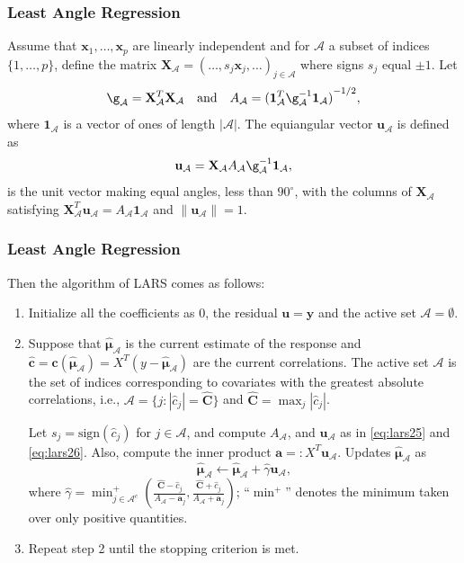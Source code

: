 \begin{frame}
\frametitle{Least Angle Regression}
Assume that $\mathbf{x}_1,\dots,\mathbf{x}_p$ are linearly independent and for $\mathcal{A}$ a subset of indices $\{1,\dots,p\}$, define the matrix $\mathbf{X}_\mathcal{A}={(\dots,s_j\mathbf{x}_j,\dots)}_{j\in\mathcal{A}}$ where signs $s_j$ equal $\pm 1$. Let
\begin{equation}
    \g_\mathcal{A}=\mathbf{X}_\mathcal{A}^T\mathbf{X}_\mathcal{A}
    \quad \text{and} \quad
    A_\mathcal{A}={(\mathbf{1}^T_\mathcal{A}\g^{-1}_\mathcal{A}\mathbf{1}_\mathcal{A})}^{-1/2},\label{eq:lars25}
\end{equation}
where $\mathbf{1}_\mathcal{A}$ is a vector of ones of length $|\mathcal{A}|$. The equiangular vector $\mathbf{u}_\mathcal{A}$ is defined as
\begin{equation}
    \mathbf{u}_\mathcal{A}=\mathbf{X}_\mathcal{A} A_\mathcal{A}\g^{-1}_\mathcal{A}\mathbf{1}_\mathcal{A},\label{eq:lars26}
\end{equation}
is the unit vector making equal angles, less than $90^\circ$, with the columns of $\mathbf{X}_\mathcal{A}$ satisfying $\mathbf{X}_\mathcal{A}^T\mathbf{u}_\mathcal{A}=A_\mathcal{A}\mathbf{1}_\mathcal{A}$ and $\|\mathbf{u}_\mathcal{A}\|=1$.
\end{frame}

\begin{frame}
\frametitle{Least Angle Regression}
Then the algorithm of LARS comes as follows:
\begin{enumerate}
    \item Initialize all the coefficients as 0, the residual $\mathbf{u}=\mathbf{y}$ and the active set $\mathcal{A}=\emptyset$.
    \item Suppose that $\hat{\mathbf{\mu}}_\mathcal{A}$ is the current estimate of the response and $\hat{\mathbf{c}}=\mathbf{c}(\hat{\mathbf{\mu}}_\mathcal{A})=X^T(y-\hat{\mathbf{\mu}}_\mathcal{A})$ are the current correlations. The active set $\mathcal{A}$ is the set of indices corresponding to covariates with the greatest absolute correlations, i.e., $\mathcal{A}=\{j:|\hat{c}_j|=\hat{\mathbf{C}}\}$ and $\hat{\mathbf{C}}=\max_{j}|\hat{c}_j|$.
    
    Let $s_j=\text{sign}(\hat{c}_j)$ for $j\in\mathcal{A}$, and compute $A_\mathcal{A}$, and $\mathbf{u}_\mathcal{A}$ as in \ref{eq:lars25} and \ref{eq:lars26}. Also, compute the inner product $\mathbf{a}=:X^T\mathbf{u}_\mathcal{A}$. Updates $\hat{\mathbf{\mu}}_\mathcal{A}$ as 
    $$\hat{\mathbf{\mu}}_\mathcal{A}\leftarrow\hat{\mathbf{\mu}}_\mathcal{A}+\hat{\gamma}\mathbf{u}_\mathcal{A},$$
    where $\hat{\gamma}=\min_{j\in\mathcal{A}^c}^+\left(\frac{\hat{\mathbf{C}}-\hat{c}_j}{A_\mathcal{A}-\mathbf{a}_j}, \frac{\hat{\mathbf{C}}+\hat{c}_j}{A_\mathcal{A}+\mathbf{a}_j}\right)$; ``$\min^+$'' denotes the minimum taken over only positive quantities.
    \item Repeat step 2 until the stopping criterion is met.
\end{enumerate}
    
\end{frame}

